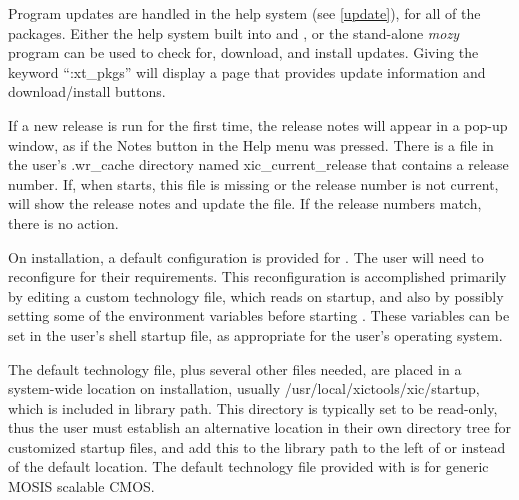 \begin{itemize}
Program updates are handled in the help system (see \ref{update}), for
all of the {\XicTools} packages.  Either the help system built into
{\Xic} and {\WRspice}, or the stand-alone {\it mozy} program can be
used to check for, download, and install updates.  Giving the keyword
``{\vt :xt\_pkgs}'' will display a page that provides update
information and download/install buttons.

If a new {\Xic} release is run for the first time, the release notes
will appear in a pop-up window, as if the {\cb Notes} button in the
{\cb Help} menu was pressed.  There is a file in the user's {\vt
.wr\_cache} directory named {\vt xic\_current\_release} that contains a
release number.  If, when {\Xic} starts, this file is missing or the
release number is not current, {\Xic} will show the release notes and
update the file.  If the release numbers match, there is no action.

On installation, a default configuration is provided for {\Xic}.  The
user will need to reconfigure {\Xic} for their requirements.  This
reconfiguration is accomplished primarily by editing a custom
technology file, which {\Xic} reads on startup, and also by possibly
setting some of the environment variables before starting {\Xic}. 
These variables can be set in the user's shell startup file, as
appropriate for the user's operating system. 

The default technology file, plus several other files needed, are
placed in a system-wide location on installation, usually {\vt
/usr/local/xictools/xic/startup}, which is included in library
path.  This directory is typically set to be read-only, thus the user
must establish an alternative location in their own directory tree for
customized startup files, and add this to the library path to the left
of or instead of the default location.  The default technology file
provided with {\Xic} is for generic MOSIS scalable CMOS.

\begin{description}


\end{description}
\end{itemize}
